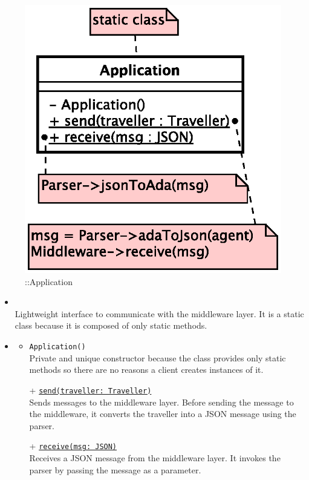 \begin{figure}[h]
\centering
\includegraphics[scale=0.6,keepaspectratio]{images/solution/app/backend/application.eps}
\caption{\pInterface::Application}
\label{fig:sd-app-application}
\end{figure}
\FloatBarrier
\begin{itemize}
  \item \textbf{\descr} \\
    Lightweight interface to communicate with the middleware layer.
    It is a static class because it is composed of only static methods.
  \item \textbf{\ops}
  \begin{itemize}
   \item \texttt{Application()} \\
   Private and unique constructor because the class provides only static methods 
    so there are no reasons a client creates instances of it.
    \item[+] \texttt{\underline{send(traveller: Traveller)}} \\
    Sends messages to the middleware layer. Before sending the message to the
    middleware, it converts the traveller into a JSON message using the parser.
    \item[+] \texttt{\underline{receive(msg: JSON)}} \\
    Receives a JSON message from the middleware layer. It invokes the parser by
    passing the message as a parameter.
  \end{itemize}
\end{itemize}
